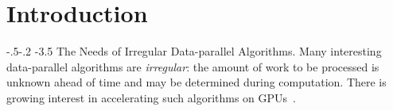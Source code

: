 \documentclass[sigconf]{acmart}
\makeatletter
\renewcommand\paragraph{\@startsection{paragraph}{4}{\z@}%
  {-.5\baselineskip \@plus -2\p@ \@minus -.2\p@}%
  {-3.5\p@}%
  {\bfseries\@parfont}}
\makeatother
\begin{document}



%
%





\maketitle

\newcommand{\myparagraph}[1]{\paragraph{#1.}}


\section{Introduction}\label{sec:intro}

\myparagraph{The Needs of Irregular Data-parallel Algorithms}
Many interesting data-parallel algorithms are \emph{irregular}: the
amount of work to be processed is unknown ahead of time and may be
determined during computation.  There is growing interest in
accelerating such algorithms on
GPUs~\cite{owens-persistent,DBLP:conf/ipps/KaleemVPHP16,DBLP:conf/ipps/DavidsonBGO14,DBLP:conf/hipc/HarishN07,DBLP:journals/topc/MerrillGG15,DBLP:conf/egh/VineetHPN09,DBLP:conf/ppopp/NobariCKB12,DBLP:conf/hpcc/SolomonTT10a,DBLP:conf/popl/PrabhuRMH11,DBLP:conf/ppopp/Mendez-LojoBP12,DBLP:conf/oopsla/PaiP16,DBLP:conf/oopsla/SorensenDBGR16,DBLP:conf/egh/CedermanT08,TPO10,BNP12,Pannotia}. 
\end{document}
